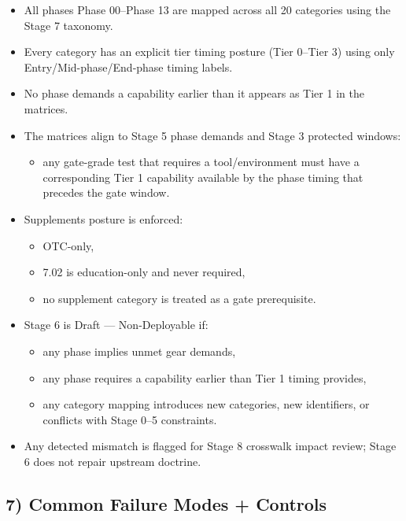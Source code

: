 \documentclass[10pt]{article}
\begin{document}
\begin{itemize}
\item All phases Phase 00–Phase 13 are mapped across all 20 categories using the Stage 7 taxonomy.
\item Every category has an explicit tier timing posture (Tier 0–Tier 3) using only Entry/Mid-phase/End-phase timing labels.
\item No phase demands a capability earlier than it appears as Tier 1 in the matrices.
\item The matrices align to Stage 5 phase demands and Stage 3 protected windows:
  \begin{itemize}
  \item any gate-grade test that requires a tool/environment must have a corresponding Tier 1 capability available by the phase timing that precedes the gate window.
  \end{itemize}
\item Supplements posture is enforced:
  \begin{itemize}
  \item OTC-only,
  \item 7.02 is education-only and never required,
  \item no supplement category is treated as a gate prerequisite.
  \end{itemize}
\item Stage 6 is Draft — Non-Deployable if:
  \begin{itemize}
  \item any phase implies unmet gear demands,
  \item any phase requires a capability earlier than Tier 1 timing provides,
  \item any category mapping introduces new categories, new identifiers, or conflicts with Stage 0–5 constraints.
  \end{itemize}
\item Any detected mismatch is flagged for Stage 8 crosswalk impact review; Stage 6 does not repair upstream doctrine.
\end{itemize}

\subsection*{7) Common Failure Modes + Controls}
\end{document}
